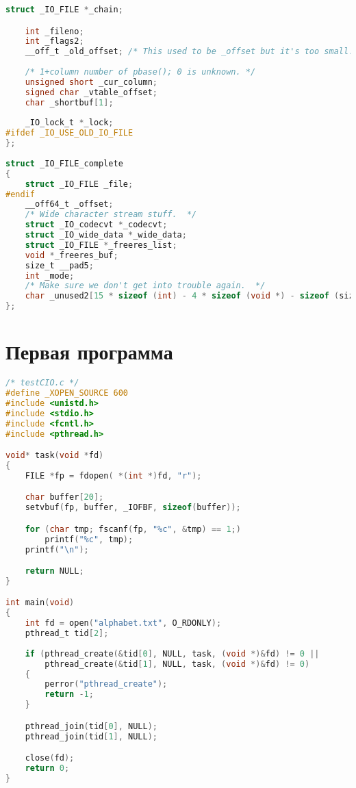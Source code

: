 \begin{lstlisting}[language=C,firstnumber=21]
    struct _IO_FILE *_chain;

    int _fileno;
    int _flags2;
    __off_t _old_offset; /* This used to be _offset but it's too small.  */
 
    /* 1+column number of pbase(); 0 is unknown. */
    unsigned short _cur_column;
    signed char _vtable_offset;
    char _shortbuf[1];
 
    _IO_lock_t *_lock;
#ifdef _IO_USE_OLD_IO_FILE
};
 
struct _IO_FILE_complete
{
    struct _IO_FILE _file;
#endif
    __off64_t _offset;
    /* Wide character stream stuff.  */
    struct _IO_codecvt *_codecvt;
    struct _IO_wide_data *_wide_data;
    struct _IO_FILE *_freeres_list;
    void *_freeres_buf;
    size_t __pad5;
    int _mode;
    /* Make sure we don't get into trouble again.  */
    char _unused2[15 * sizeof (int) - 4 * sizeof (void *) - sizeof (size_t)];
};
\end{lstlisting}

\chapter{Первая программа}

\begin{lstlisting}[language=C]
/* testCIO.c */
#define _XOPEN_SOURCE 600
#include <unistd.h>
#include <stdio.h>
#include <fcntl.h>
#include <pthread.h>

void* task(void *fd)
{
    FILE *fp = fdopen( *(int *)fd, "r");

    char buffer[20];
    setvbuf(fp, buffer, _IOFBF, sizeof(buffer));

    for (char tmp; fscanf(fp, "%c", &tmp) == 1;)
        printf("%c", tmp);
    printf("\n");

    return NULL;
}

int main(void)
{
    int fd = open("alphabet.txt", O_RDONLY);
    pthread_t tid[2];
    
    if (pthread_create(&tid[0], NULL, task, (void *)&fd) != 0 ||
        pthread_create(&tid[1], NULL, task, (void *)&fd) != 0)
    {
        perror("pthread_create");
        return -1;
    }

    pthread_join(tid[0], NULL);
    pthread_join(tid[1], NULL);

    close(fd);
    return 0;
}    
\end{lstlisting}

\clearpage

